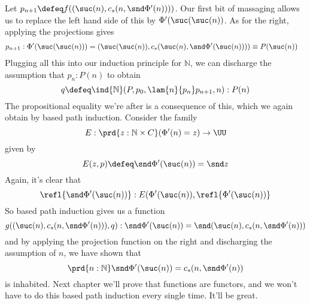Let $p_{n+1} \defeq f((\suc(n), c_{s}(n, \snd \Phi'(n))))$.
Our first bit of massaging allows us to replace the left hand side of this by
$\Phi'(\suc(\suc(n))$.  As for the right, applying the projections gives
\begin{align*}
p_{n+1} &: \Phi'(\suc(\suc(n))) 
=
(\suc(\suc(n)), c_{s}(\suc(n), \snd\Phi'(\suc(n)))) 
\equiv P(\suc(n))
\end{align*}
Plugging all this into our induction principle for $\mathbb{N}$, we can
discharge the assumption that $p_{n} : P(n)$ to obtain
\[
q \defeq \ind{\mathbb{N}}(P, p_{0}, \lam{n}{p_{n}}p_{n+1}, n) : P(n)
\]
The propositional equality we're after is a consequence of this, which we again
obtain by based path induction.  Consider the family
\[
E : \prd{z:\mathbb{N} \times C}(\Phi'(n) = z) \to \UU
\]
given by
\[
E(z, p) \defeq 
\snd\Phi'(\suc(n)) = \snd z
\]
Again, it's clear that
\[
\refl{\snd\Phi'(\suc(n))} : E(\Phi'(\suc(n)), \refl{\Phi'(\suc(n))}
\]
So based path induction gives us a function
\[
g((\suc(n), c_{s}(n, \snd\Phi'(n))), q) : 
\snd\Phi'(\suc(n)) = \snd (\suc(n), c_{s}(n, \snd\Phi'(n)))
\]
and by applying the projection function on the right and discharging the
assumption of $n$, we have shown that
\[
\prd{n:\mathbb{N}}\snd\Phi'(\suc(n)) = c_{s}(n, \snd\Phi'(n))
\]
is inhabited.  Next chapter we'll prove that functions are functors, and we
won't have to do this based path induction every single time.  It'll be great.
